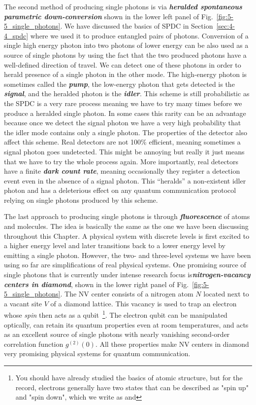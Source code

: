 The second method of producing single photons is via \textit{\textbf{heralded spontaneous parametric down-conversion}} shown in the lower left panel of Fig.~\ref{fig:5-5_single_photons}.
We have discussed the basics of SPDC in Section~\ref{sec:4-4_spdc} where we used it to produce entangled pairs of photons.
Conversion of a single high energy photon into two photons of lower energy can be also used as a source of single photons by using the fact that the two produced photons have a well-defined direction of travel.
We can detect one of these photons in order to herald presence of a single photon in the other mode.
The high-energy photon is sometimes called the \textit{\textbf{pump}}, the low-energy photon that gets detected is the \textit{\textbf{signal}}, and the heralded photon is the \textit{\textbf{idler}}.
This scheme is still probabilistic as the SPDC is a very rare process meaning we have to try many times before we produce a heralded single photon.
In some cases this rarity can be an advantage because once we detect the signal photon we have a very high probability that the idler mode contains only a single photon.
The properties of the detector also affect this scheme.
Real detectors are not 100\% efficient, meaning sometimes a signal photon goes undetected.
This might be annoying but really it just means that we have to try the whole process again.
More importantly, real detectors have a finite \textit{\textbf{dark count rate}}, meaning occasionally they register a detection event even in the absence of a signal photon.
This ``heralds'' a non-existent idler photon and has a deleterious effect on any quantum communication protocol relying on single photons produced by this scheme.

The last approach to producing single photons is through \textit{\textbf{fluorescence}} of atoms and molecules.
The idea is basically the same as the one we have been discussing throughout this Chapter.
A physical system with discrete levels is first excited to a higher energy level and later transitions back to a lower energy level by emitting a single photon.
However, the two- and three-level systems we have been using so far are simplifications of real physical systems.
One promising source of single photons that is currently under intense research focus is\textit{\textbf{nitrogen-vacancy centers in diamond}}, shown in the lower right panel of Fig.~\ref{fig:5-5_single_photons}.
The NV center consists of a nitrogen atom $N$ located next to a vacant site $V$ of a diamond lattice.
This vacancy is used to trap an electron whose \emph{spin} then acts as a qubit~\footnote{You should have already studied the basics of atomic structure, but for the record, electrons generally have two states that can be described as "spin up" and "spin down", which we write as \ket{\uparrow} and \ket{\downarrow}}.
The electron qubit can be manipulated optically, can retain its quantum properties even at room temperatures, and acts as an excellent source of single photons with nearly vanishing second-order correlation function $g^{(2)}(0)$.
All these properties make NV centers in diamond very promising physical systems for quantum communication.


